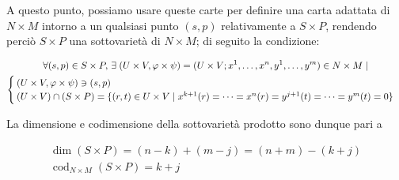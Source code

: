{A questo punto, possiamo usare queste carte per definire una carta adattata di $ N \times M $ intorno a un qualsiasi punto $ (s,p) $ relativamente a $ S \times P $, rendendo perciò $ S \times P $ una sottovarietà di $ N \times M $; di seguito la condizione:

\begin{gather}
	\forall (s,p) \in S \times P, \, \exists \; (U \times V, \varphi \times \psi) = (U \times V; x^{1},\dots,x^{n}, y^{1},\dots,y^{m}) \in N \times M \mid \nonumber \\
	\begin{cases}
		(U \times V, \varphi \times \psi) \ni (s,p) \\
		(U \times V) \cap (S \times P) = \{ (r,t) \in U \times V \mid x^{k+1}(r) = \dots = x^{n}(r) = y^{j+1}(t) = \dots = y^{m}(t) = 0 \}
	\end{cases}
\end{gather}

La dimensione e codimensione della sottovarietà prodotto sono dunque pari a

\begin{gather}
	\dim(S \times P) = (n - k) + (m - j) = (n + m) - (k + j) \\
	\operatorname{cod}_{N \times M}(S \times P) = k + j
\end{gather}
}


